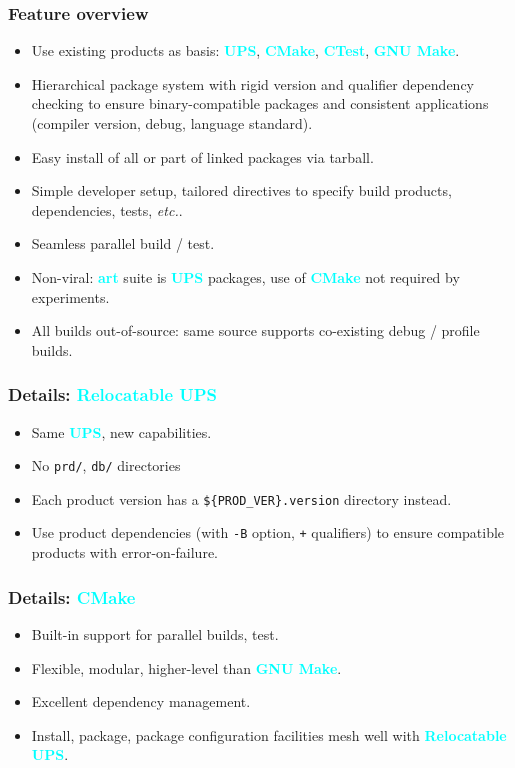 \documentclass[xcolor={dvipsnames,table},c,compress,colorlinks]{beamer}
\newcommand{\productname}[1]{\textbf{\textcolor{cyan}{#1}}\xspace}
\newcommand{\cmd}[1]{\texttt{#1}\xspace}
\newcommand{\art}{\productname{art}}
\newcommand{\etc}{\textit{etc.}}
\newcommand{\cmake}{\productname{CMake}}
\newcommand{\make}{\productname{GNU Make}}
\newcommand{\ups}{\productname{UPS}}
\newcommand{\rups}{\productname{Relocatable UPS}}
\begin{document}
\begin{frame}\frametitle{Feature overview}
  \begin{itemize}
  \item Use existing products as basis: \ups, \cmake,
    \productname{CTest}, \make.
  \item Hierarchical package system with rigid version and qualifier
    dependency checking to ensure binary-compatible packages and
    consistent applications (compiler version, debug, language
    standard).
  \item Easy install of all or part of linked packages via tarball.
  \item Simple developer setup, tailored directives to specify build
    products, dependencies, tests, \etc.
  \item Seamless parallel build / test.
  \item Non-viral: \art suite is \ups packages, use of \cmake not
    required by experiments.
  \item All builds out-of-source: same source supports co-existing debug
    / profile builds.
  \end{itemize}
\end{frame}

\begin{frame}\frametitle{Details: \rups}
  \begin{itemize}
  \item Same \ups, new capabilities.
  \item No \cmd{prd/}, \cmd{db/} directories
  \item Each product version has a \cmd{\$\{PROD\_VER\}.version}
    directory instead.
  \item Use product dependencies (with \cmd{-B} option, \cmd{+}
    qualifiers) to ensure compatible products with error-on-failure.
  \end{itemize}
\end{frame}

\begin{frame}\frametitle{Details: \cmake}
  \begin{itemize}
  \item Built-in support for parallel builds, test.
  \item Flexible, modular, higher-level than \make.
  \item Excellent dependency management.
  \item Install, package, package configuration facilities mesh well
    with \rups.
  \end{itemize}
\end{frame}
\end{document}
